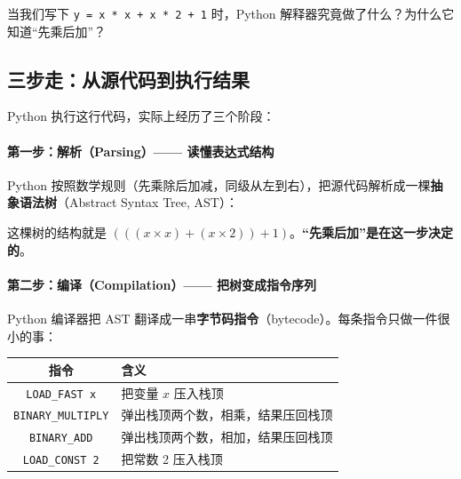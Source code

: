 
当我们写下 \texttt{y = x * x + x * 2 + 1} 时，Python 解释器究竟做了什么？为什么它知道``先乘后加''？

\subsection*{三步走：从源代码到执行结果}

Python 执行这行代码，实际上经历了三个阶段：

\paragraph{第一步：解析（Parsing）—— 读懂表达式结构}

Python 按照数学规则（先乘除后加减，同级从左到右），把源代码解析成一棵\textbf{抽象语法树}（Abstract Syntax Tree, AST）：

\begin{center}
\end{center}

这棵树的结构就是 $(((x \times x) + (x \times 2)) + 1)$。\textbf{``先乘后加''是在这一步决定的}。

\paragraph{第二步：编译（Compilation）—— 把树变成指令序列}

Python 编译器把 AST 翻译成一串\textbf{字节码指令}（bytecode）。每条指令只做一件很小的事：

\begin{center}
\renewcommand{\arraystretch}{1.3}
\begin{tabular}{cl}
\toprule
\textbf{指令} & \textbf{含义} \\
\midrule
\texttt{LOAD\_FAST x} & 把变量 $x$ 压入栈顶 \\
\texttt{BINARY\_MULTIPLY} & 弹出栈顶两个数，相乘，结果压回栈顶 \\
\texttt{BINARY\_ADD} & 弹出栈顶两个数，相加，结果压回栈顶 \\
\texttt{LOAD\_CONST 2} & 把常数 2 压入栈顶 \\
\bottomrule
\end{tabular}
\end{center}

